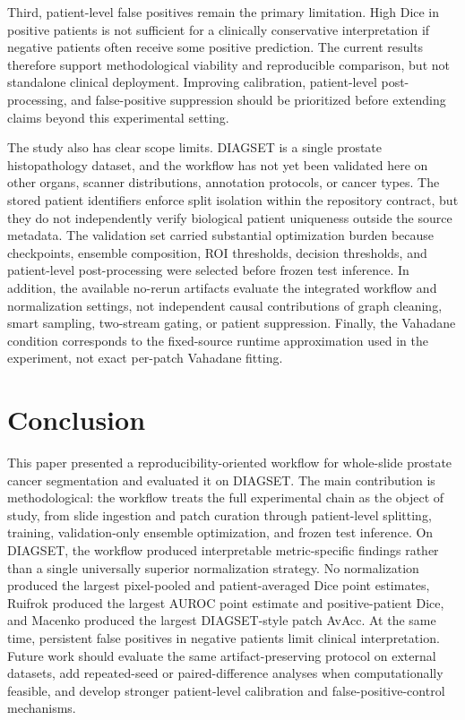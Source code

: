 \documentclass[a4paper,fleqn]{cas-dc}
\begin{document}
Third, patient-level false positives remain the primary limitation. High Dice in positive patients is not sufficient for a clinically conservative interpretation if negative patients often receive some positive prediction. The current results therefore support methodological viability and reproducible comparison, but not standalone clinical deployment. Improving calibration, patient-level post-processing, and false-positive suppression should be prioritized before extending claims beyond this experimental setting.

The study also has clear scope limits. DIAGSET is a single prostate histopathology dataset, and the workflow has not yet been validated here on other organs, scanner distributions, annotation protocols, or cancer types. The stored patient identifiers enforce split isolation within the repository contract, but they do not independently verify biological patient uniqueness outside the source metadata. The validation set carried substantial optimization burden because checkpoints, ensemble composition, ROI thresholds, decision thresholds, and patient-level post-processing were selected before frozen test inference. In addition, the available no-rerun artifacts evaluate the integrated workflow and normalization settings, not independent causal contributions of graph cleaning, smart sampling, two-stream gating, or patient suppression. Finally, the Vahadane condition corresponds to the fixed-source runtime approximation used in the experiment, not exact per-patch Vahadane fitting.

\section{Conclusion}

This paper presented a reproducibility-oriented workflow for whole-slide prostate cancer segmentation and evaluated it on DIAGSET. The main contribution is methodological: the workflow treats the full experimental chain as the object of study, from slide ingestion and patch curation through patient-level splitting, training, validation-only ensemble optimization, and frozen test inference. On DIAGSET, the workflow produced interpretable metric-specific findings rather than a single universally superior normalization strategy. No normalization produced the largest pixel-pooled and patient-averaged Dice point estimates, Ruifrok produced the largest AUROC point estimate and positive-patient Dice, and Macenko produced the largest DIAGSET-style patch AvAcc. At the same time, persistent false positives in negative patients limit clinical interpretation. Future work should evaluate the same artifact-preserving protocol on external datasets, add repeated-seed or paired-difference analyses when computationally feasible, and develop stronger patient-level calibration and false-positive-control mechanisms.
\end{document}
